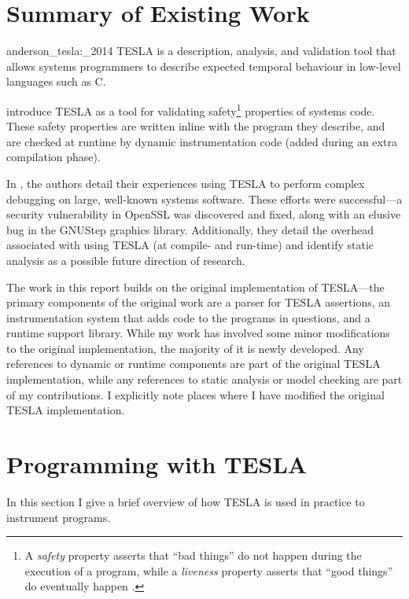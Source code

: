 \section{Summary of Existing Work}

\begin{displaycquote}[p. 1]{anderson_tesla:_2014}
TESLA is a description, analysis, and validation tool that allows systems
  programmers to describe expected temporal behaviour in low-level languages
  such as C.
\end{displaycquote}

\textcite{anderson_tesla:_2014} introduce TESLA as a tool for validating
safety\footnote{A \emph{safety} property asserts that ``bad things'' do not
happen during the execution of a program, while a \emph{liveness} property
asserts that ``good things'' do eventually happen
\cite{lamport_proving_1977,alpern_defining_1984}.} properties of systems code.
These safety properties are written inline with the program they describe, and
are checked at runtime by dynamic instrumentation code (added during an extra
compilation phase).

In \cite{anderson_tesla:_2014}, the authors detail their experiences using TESLA
to perform complex debugging on large, well-known systems software. These
efforts were successful---a security vulnerability in OpenSSL was discovered and
fixed, along with an elusive bug in the GNUStep graphics library. Additionally,
they detail the overhead associated with using TESLA (at compile- and run-time)
and identify static analysis as a possible future direction of research.

The work in this report builds on the original implementation of TESLA---the
primary components of the original work are a parser for TESLA assertions, an
instrumentation system that adds code to the programs in questions, and a
runtime support library. While my work has involved some minor modifications to
the original implementation, the majority of it is newly developed. Any
references to dynamic or runtime components are part of the original TESLA
implementation, while any references to static analysis or model checking are
part of my contributions. I explicitly note places where I have modified the
original TESLA implementation.

\section{Programming with TESLA}

In this section I give a brief overview of how TESLA is used in practice
to instrument programs.

